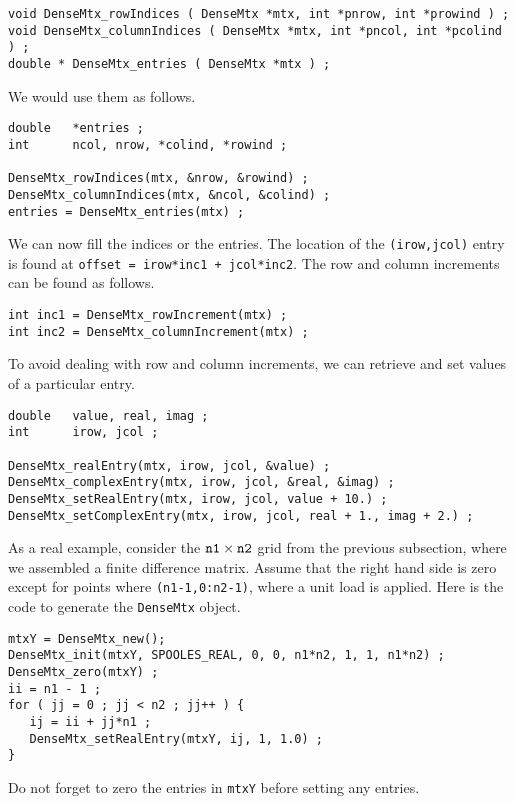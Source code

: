 \begin{verbatim}
void DenseMtx_rowIndices ( DenseMtx *mtx, int *pnrow, int *prowind ) ;
void DenseMtx_columnIndices ( DenseMtx *mtx, int *pncol, int *pcolind ) ;
double * DenseMtx_entries ( DenseMtx *mtx ) ;
\end{verbatim}
We would use them as follows.
\begin{verbatim}
double   *entries ;
int      ncol, nrow, *colind, *rowind ;

DenseMtx_rowIndices(mtx, &nrow, &rowind) ;
DenseMtx_columnIndices(mtx, &ncol, &colind) ;
entries = DenseMtx_entries(mtx) ;
\end{verbatim}
We can now fill the indices or the entries.
The location of the {\tt (irow,jcol)} entry is found
at {\tt offset = irow*inc1 + jcol*inc2}.
The row and column increments can be found as follows.
\begin{verbatim}
int inc1 = DenseMtx_rowIncrement(mtx) ;
int inc2 = DenseMtx_columnIncrement(mtx) ;
\end{verbatim}
\par
To avoid dealing with row and column increments, 
we can retrieve and set values of a particular entry.
\begin{verbatim}
double   value, real, imag ;
int      irow, jcol ;

DenseMtx_realEntry(mtx, irow, jcol, &value) ;
DenseMtx_complexEntry(mtx, irow, jcol, &real, &imag) ;
DenseMtx_setRealEntry(mtx, irow, jcol, value + 10.) ;
DenseMtx_setComplexEntry(mtx, irow, jcol, real + 1., imag + 2.) ;
\end{verbatim}
As a real example, consider the ${\tt n1} \times {\tt n2}$ grid
from the previous subsection, where we assembled a finite
difference matrix. 
Assume that the right hand side is zero except for points where
{\tt (n1-1,0:n2-1)}, where a unit load is applied.
Here is the code to generate the {\tt DenseMtx} object.
\begin{verbatim}
mtxY = DenseMtx_new();
DenseMtx_init(mtxY, SPOOLES_REAL, 0, 0, n1*n2, 1, 1, n1*n2) ;
DenseMtx_zero(mtxY) ;
ii = n1 - 1 ;
for ( jj = 0 ; jj < n2 ; jj++ ) {
   ij = ii + jj*n1 ;
   DenseMtx_setRealEntry(mtxY, ij, 1, 1.0) ;
}
\end{verbatim}
Do not forget to zero the entries in {\tt mtxY} before setting any
entries.
\par
